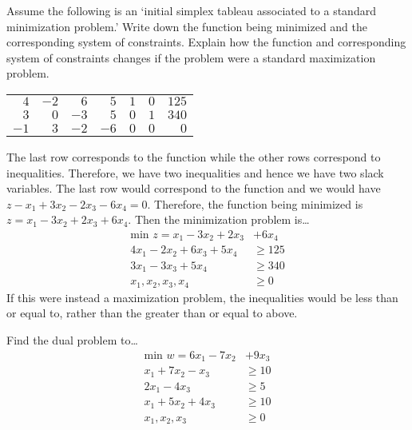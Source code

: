 \documentclass[11pt,letterpaper]{article}
\begin{document}
\newpage



 Assume the following is an `initial simplex tableau associated to a standard minimization problem.' Write down the function being minimized and the corresponding system of constraints. Explain how the function and corresponding system of constraints changes if the problem were a standard maximization problem.
	\begin{table}[!ht]
	\centering
	\begin{tabular}{rrrrrr|r}
	$4$ & $-2$ & $6$ & $5$ & $1$ & $0$ & $125$ \\
	$3$ & $0$ & $-3$ & $5$ & $0$ & $1$ & $340$ \\ \hline
	$-1$ & $3$ & $-2$ & $-6$ & $0$ & $0$ & $0$ 
	\end{tabular}
	\end{table} \pspace

\sol The last row corresponds to the function while the other rows correspond to inequalities. Therefore, we have two inequalities and hence we have two slack variables. The last row would correspond to the function and we would have $z - x_1 + 3x_2 - 2x_3 - 6x_4= 0$. Therefore, the function being minimized is $z= x_1 - 3x_2 + 2x_3 + 6x_4$. Then the minimization problem is\dots
	\[
	\begin{aligned}
	\text{min } z= x_1 - 3x_2 + 2x_3 &+ 6x_4 \\
	4x_1 - 2x_2 + 6x_3 + 5x_4&\geq 125 \\
	3x_1 - 3x_3 + 5x_4&\geq 340 \\
	x_1, x_2, x_3, x_4&\geq 0
	\end{aligned}
	\]
If this were instead a maximization problem, the inequalities would be less than or equal to, rather than the greater than or equal to above. 



\newpage



 Find the dual problem to\dots
	\[
	\begin{aligned}
	\text{min } w= 6x_1 - 7x_2 &+ 9x_3 \\
	x_1 + 7x_2 - x_3&\geq 10 \\
	2x_1 - 4x_3&\geq 5 \\
	x_1 + 5x_2 + 4x_3&\geq 10 \\
	x_1, x_2, x_3&\geq 0 
	\end{aligned}
	\] \pspace
\end{document}
